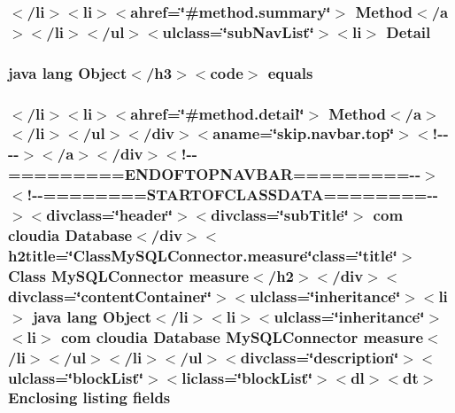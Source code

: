 \hypertarget{_my_s_q_l_connector_8measure_8html_a1e04b5ec07bcd5281e26dcd40e5b3a94}{
\subsubsection[{Detail}]{\setlength{\rightskip}{0pt plus 5cm}$<$/li$>$$<$li$>$$<$ahref=\char`\"{}\#method.\-summary\char`\"{}$>$ Method$<$/{\bf a}$>$$<$/li$>$$<$/ul$>$$<$ulclass=\char`\"{}sub\-Nav\-List\char`\"{}$>$$<$li$>$ Detail}}\label{_my_s_q_l_connector_8measure_8html_a1e04b5ec07bcd5281e26dcd40e5b3a94}
\hypertarget{_my_s_q_l_connector_8measure_8html_a8974318cea585f72df717e0380ec7104}{
\subsubsection[{equals}]{\setlength{\rightskip}{0pt plus 5cm}java lang Object$<$/h3$>$$<$code$>$ equals}}\label{_my_s_q_l_connector_8measure_8html_a8974318cea585f72df717e0380ec7104}
\hypertarget{_my_s_q_l_connector_8measure_8html_a9bdc67ab8910b38c5b46b9530b9efac9}{
\subsubsection[{fields}]{\setlength{\rightskip}{0pt plus 5cm}$<$/li$>$$<$li$>$$<$ahref=\char`\"{}\#method.\-detail\char`\"{}$>$ Method$<$/{\bf a}$>$$<$/li$>$$<$/ul$>$$<$/div$>$$<$aname=\char`\"{}skip.\-navbar.\-top\char`\"{}$>$$<$!-\/-\/-\/-\/$>$$<$/a$>$$<$/div$>$$<$!-\/-\/=========E\-N\-D\-O\-F\-T\-O\-P\-N\-A\-V\-B\-A\-R=========-\/-\/$>$$<$!-\/-\/========S\-T\-A\-R\-T\-O\-F\-C\-L\-A\-S\-S\-D\-A\-T\-A========-\/-\/$>$$<$divclass=\char`\"{}header\char`\"{}$>$$<$divclass=\char`\"{}sub\-Title\char`\"{}$>$ com cloudia Database$<$/div$>$$<$h2title=\char`\"{}Class\-My\-S\-Q\-L\-Connector.\-measure\char`\"{}class=\char`\"{}title\char`\"{}$>$ Class {\bf My\-S\-Q\-L\-Connector} {\bf measure}$<$/h2$>$$<$/div$>$$<$divclass=\char`\"{}content\-Container\char`\"{}$>$$<$ulclass=\char`\"{}inheritance\char`\"{}$>$$<$li$>$ java lang Object$<$/li$>$$<$li$>$$<$ulclass=\char`\"{}inheritance\char`\"{}$>$$<$li$>$ com cloudia Database {\bf My\-S\-Q\-L\-Connector} {\bf measure}$<$/li$>$$<$/ul$>$$<$/li$>$$<$/ul$>$$<$divclass=\char`\"{}description\char`\"{}$>$$<$ulclass=\char`\"{}block\-List\char`\"{}$>$$<$liclass=\char`\"{}block\-List\char`\"{}$>$$<$dl$>$$<${\bf dt}$>$ Enclosing listing fields}}\label{_my_s_q_l_connector_8measure_8html_a9bdc67ab8910b38c5b46b9530b9efac9}
